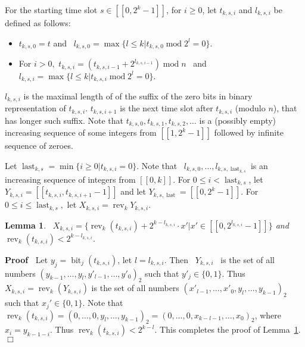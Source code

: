 \documentclass{article}
\newcommand{\tmop}[1]{\ensuremath{\operatorname{#1}}}
\newenvironment{proof}{\noindent\textbf{Proof\ }}{\hspace*{\fill}$\Box$\medskip}
\newtheorem{lemma}{Lemma}
\begin{document}
For the starting time slot $s \in [[0, 2^k - 1]]$, for $i \geq 0$, let $t_{k,
s, i}$ and $l_{k, s, i}$ be defined as follows:
\begin{itemize}
  \item  $t_{k, s, 0} = t$ and \ $l_{k, s, 0} = \max \{l \leq k | t_{k, s, 0}
  \tmop{mod} 2^l = 0\}$.
  
  \item For $i > 0,$ $t_{k, s, i} = (t_{k, s, i - 1} + 2^{l_{k, s, i - 1}})
  \tmop{mod} n$ \ and $l_{k, s, i} = \max \{l \leq k | t_{k, s, i} \tmop{mod}
  2^l = 0\}.$
\end{itemize}
$l_{k, s, i}$ is the maximal length of of the suffix of the zero bits in
binary representation of $t_{k, s, i}$.  
$t_{k, s, i+1}$ is the next time slot after  $t_{k, s, i}$ (modulo $n$),
that has longer such suffix.
Note that $t_{k, s, 0}, t_{k, s, 1}, t_{k, s, 2}, \ldots$ is a (possibly
empty) increasing sequence of some integers from $[[1, 2^k - 1]]$ followed by
infinite sequence of zeroes.

Let $\tmop{last}_{k, s} = \min \{i \geq 0 | t_{k, s, i} = 0\}$. Note that \
$l_{k, s, 0}, \ldots, l_{k, s, \tmop{last}_{k, s}}$ is an increasing sequence
of integers from $[[0, k]]$. For $0 \leq i < \tmop{last}_{k, s}$, let $Y_{k,
s, i} = [[t_{k, s, i}, t_{k, s, i + 1} - 1]]$ and let $Y_{k, s, \tmop{last}} =
[[0, 2^k - 1]]$. For $0 \leq i \leq \tmop{last}_{k, s},$ let $X_{k, s, i} =
\tmop{rev}_k Y_{k, s, i}$.

\begin{lemma}
  \label{X_i-Lemma} \ $X_{k, s, i} =\{\tmop{rev}_k (t_{k, s, i}) + 2^{k -
  l_{k, s, i}} \cdot x' | x' \in [[0, 2^{l_{k, s, i}} - 1]]\}$ and
  $\tmop{rev}_k (t_{k, s, i}) < 2^{k - l_{k, s, i}}$.
\end{lemma}

\begin{proof}
  Let $y_j = \tmop{bit}_j (t_{k, s, i})$, let $l =
  l_{k, s, i}$. Then \ $Y_{k, s, i}$ \ is the set of all numbers $(y_{k - 1},
  \ldots, y_l, y'_{l - 1}, \ldots, y'_0)_2$ such that $y'_j \in \{0, 1\}$.
  Thus $X_{k, s, i} = \tmop{rev}_k (Y_{k, s, i})$ is the set of all numbers
  $(x'_{l - 1}, \ldots, x'_0, y_l, \ldots, y_{k - 1})_2$ such that $x_j' \in
  \{0, 1\}$. Note that $\tmop{rev}_k (t_{k, s, i}) = (0, \ldots, 0, y_l,
  \ldots, y_{k - 1})_2 = (0, \ldots, 0, x_{k - l - 1}, \ldots, x_0)_2$, where
  $x_i = y_{k - 1 - i}$. Thus $\tmop{rev}_k (t_{k, s, i}) < 2^{k - l}$. This
  completes the proof of Lemma~\ref{X_i-Lemma}.
\end{proof}
\end{document}
